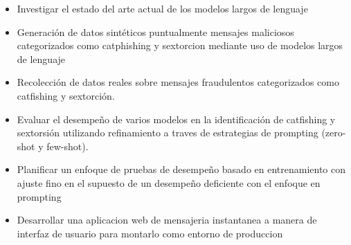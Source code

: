 
\begin{itemize}
    \item Investigar el estado del arte actual de los modelos largos de lenguaje
    \item Generación de datos sintéticos puntualmente mensajes maliciosos categorizados como catphishing y sextorcion mediante uso de modelos largos de lenguaje

    \item Recolección de datos reales sobre mensajes fraudulentos categorizados como catfishing y sextorción.

    \item Evaluar el desempeño de varios modelos en la identificación de catfishing y sextorsión utilizando refinamiento a traves de estrategias de prompting (zero-shot y few-shot).
   
    \item Planificar un enfoque de pruebas de desempeño basado en entrenamiento con ajuste fino en el supuesto de un desempeño deficiente con el enfoque en prompting


    \item Desarrollar una aplicacion web de mensajeria instantanea a manera de interfaz de usuario para montarlo como entorno de produccion

   

\end{itemize}


